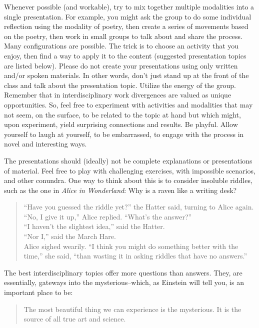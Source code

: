 \documentclass[letterpaper,10pt,headsepline]{scrreprt}
\begin{document}
 Whenever possible (and workable), try to mix together multiple modalities into a single presentation. For example, you might ask the group to do some individual reflection using the modality of poetry,
 then create a series of movements based on the poetry, then work in small groups to talk about and share the process. Many configurations are possible. The trick is to choose an activity that you enjoy, then find a way to apply it to the content (suggested presentation topics are listed below). Please do not create your presentations using only written and/or spoken materials. In other words, don't just stand up at the front of the class and talk about the presentation topic. Utilize the energy of the group. Remember that in interdisciplinary work divergences are valued as unique opportunities. So, feel free to experiment with activities and modalities that may not seem, on the surface, to be related to the topic at hand but which might, upon experiment, yield surprising connections and results. Be playful.
 Allow yourself to laugh at yourself, to be embarrassed, to engage with the process in novel and interesting ways.

The presentations should (ideally) not be complete explanations or presentations of material. Feel free to play with challenging exercises, with impossible scenarios, and other conundra. One way to think about this is to consider insoluble riddles, such as the one in \textit{Alice in Wonderland}: Why is a raven like a
writing desk?

\begin{quote}
  ``Have you guessed the riddle yet?'' the Hatter said, turning to Alice again.\\
``No, I give it up,'' Alice replied. ``What's the answer?''\\
``I haven't the slightest idea,'' said the Hatter.\\
``Nor I,'' said the March Hare.\\
Alice sighed wearily. ``I think you might do something better with the time,'' she said, ``than wasting it in asking riddles that have no answers.''
\end{quote}

The best interdisciplinary topics offer more questions than answers. They, are essentially, gateways into the mysterious--which, as Einstein will tell you, is an important place to be:

\begin{quote}
  The most beautiful thing we can experience is the mysterious. It is
  the source of all true art and science.
\end{quote}
\end{document}
